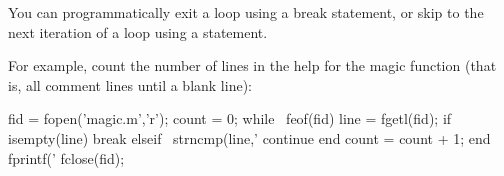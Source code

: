 			You can programmatically exit a loop using a break statement, or skip to the next iteration of a loop using a  statement. 

			For example, count the number of lines in the help for the magic function (that is, all comment lines until a blank line):

fid = fopen('magic.m','r');
count = 0;
while ~feof(fid)
    line = fgetl(fid);
    if isempty(line)
       break
    elseif ~strncmp(line,'%
       continue
    end
    count = count + 1;
end
fprintf('%
fclose(fid);












